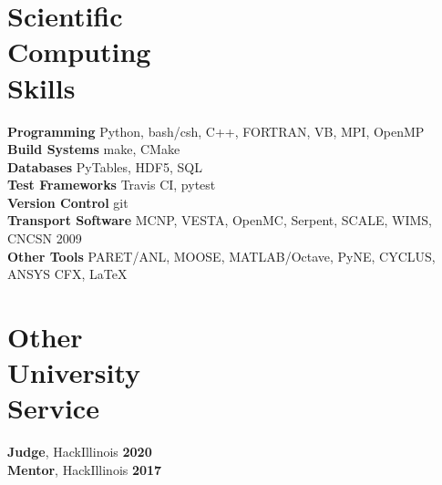 \documentclass[margin,line]{resume}
\begin{document}
\begin{resume}
    \section{\mysidestyle Scientific\\Computing\\Skills}
                \textbf{Programming} \hfill Python, bash/csh, C++, FORTRAN, 
                VB, MPI, OpenMP \vspace{.5mm}\\%
                \textbf{Build Systems} \hfill make, CMake\vspace{.5mm}\\%
                \textbf{Databases} \hfill PyTables, HDF5, SQL\vspace{.5mm}\\%
                \textbf{Test Frameworks} \hfill Travis CI, 
                pytest\vspace{.5mm}\\%
                \textbf{Version Control} \hfill git\vspace{.5mm}\\%
                \textbf{Transport Software} \hfill MCNP, VESTA, OpenMC, Serpent,
                SCALE, WIMS, CNCSN 2009 \vspace{.5mm}\\%
                \textbf{Other Tools} \hfill  PARET/ANL, MOOSE, MATLAB/Octave, PyNE, 
                CYCLUS, ANSYS CFX, \LaTeX \vspace{.5mm}%

    \section{\mysidestyle Other\\University\\Service}
		\textbf{Judge}, HackIllinois \hfill \textbf{2020}\vspace{.5mm}\\%
		\textbf{Mentor}, HackIllinois \hfill 
		\textbf{2017}\vspace{.5mm}\\%


\end{resume}
\end{document}
